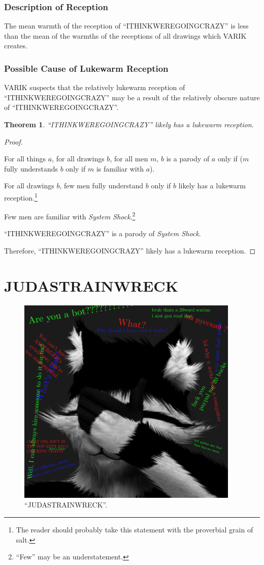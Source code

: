 \documentclass{report}
\newtheorem{thm}{Theorem}
\begin{document}
\subsection{Description of Reception}
The mean warmth of the reception of ``ITHINKWEREGOINGCRAZY'' is less than the mean of the warmths of the receptions of all drawings which VARIK creates.
\subsection{Possible Cause of Lukewarm Reception}
VARIK suspects that the relatively lukewarm reception of ``ITHINKWEREGOINGCRAZY'' may be a result of the relatively obscure nature of ``ITHINKWEREGOINGCRAZY''.
\begin{thm}
``ITHINKWEREGOINGCRAZY'' likely has a lukewarm reception.
\end{thm}
\begin{proof}
${}$

For all things $a$, for all drawings $b$, for all men $m$, $b$ is a parody of $a$ only if ($m$ fully understands $b$ only if $m$ is familiar with $a$).

For all drawings $b$, few men fully understand $b$ only if $b$ likely has a lukewarm reception.\footnote{The reader should probably take this statement with the proverbial grain of salt.}

Few men are familiar with \textit{System Shock}.\footnote{``Few'' may be an understatement.}

``ITHINKWEREGOINGCRAZY'' is a parody of \textit{System Shock}.

Therefore, ``ITHINKWEREGOINGCRAZY'' likely has a lukewarm reception.
\end{proof}
\chapter{JUDASTRAINWRECK}
\begin{figure}[ht]
	\centering
	\includegraphics[height=10cm]{judastrainwreck/judastrainwreck.png}
	\caption[center]{``JUDASTRAINWRECK''.}
\end{figure}
\end{document}
